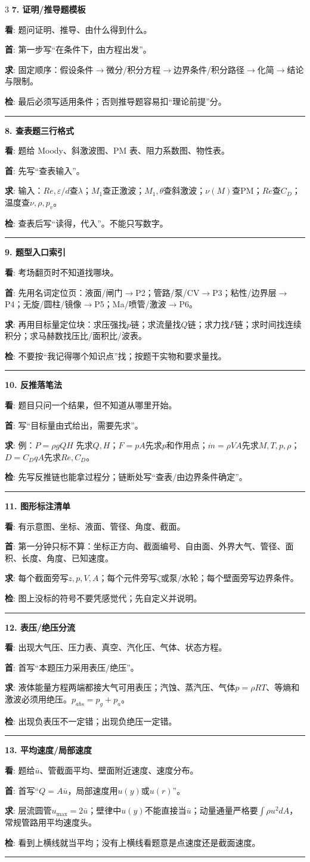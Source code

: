 \documentclass[UTF8,a4paper]{ctexart}
\newcommand{\lab}[1]{\textbf{\textcolor{B}{#1}}}
\newcommand{\blk}[5]{\textbf{\textcolor{B}{#1}}\par
\lab{看}: #2\par
\lab{首}: #3\par
\lab{求}: #4\par
\lab{检}: #5\par\vspace{1pt}\hrule\vspace{1.2pt}}
\begin{document}
\begin{multicols}{3}
\blk{7. 证明/推导题模板}
{题问证明、推导、由什么得到什么。}
{第一步写“在\underline{\hspace{0.45cm}}条件下，由\underline{\hspace{0.6cm}}方程出发”。}
{固定顺序：假设条件$\to$微分/积分方程$\to$边界条件/积分路径$\to$化简$\to$结论与限制。}
{最后必须写适用条件；否则推导题容易扣“理论前提”分。}

\blk{8. 查表题三行格式}
{题给 Moody、斜激波图、PM 表、阻力系数图、物性表。}
{先写“查表输入”。}
{输入：$Re,\varepsilon/d$查$\lambda$；$M_1$查正激波；$M_1,\theta$查斜激波；$\nu(M)$查PM；$Re$查$C_D$；温度查$\nu,\rho,p_v$。}
{查表后写“读得\underline{\hspace{0.5cm}}，代入\underline{\hspace{0.5cm}}”。不能只写数字。}

\blk{9. 题型入口索引}
{考场翻页时不知道找哪块。}
{先用名词定位页：液面/闸门$\to$P2；管路/泵/CV$\to$P3；粘性/边界层$\to$P4；无旋/圆柱/镜像$\to$P5；Ma/喷管/激波$\to$P6。}
{再用目标量定位块：求压强找$p$链；求流量找$Q$链；求力找$F$链；求时间找连续积分；求马赫数找压比/面积比/波表。}
{不要按“我记得哪个知识点”找；按题干实物和要求量找。}

\blk{10. 反推落笔法}
{题目只问一个结果，但不知道从哪里开始。}
{写“目标量由\underline{\hspace{0.5cm}}式给出，需要先求\underline{\hspace{0.5cm}}”。}
{例：$P=\rho gQH$ 先求$Q,H$；$F=pA$先求$p$和作用点；$\dot m=\rho VA$先求$M,T,p,\rho$；$D=C_DqA$先求$Re,C_D$。}
{先写反推链也能拿过程分；链断处写“查表/由边界条件确定”。}

\blk{11. 图形标注清单}
{有示意图、坐标、液面、管径、角度、截面。}
{第一分钟只标不算：坐标正方向、截面编号、自由面、外界大气、管径、面积、长度、角度、已知速度。}
{每个截面旁写$z,p,V,A$；每个元件旁写$\zeta$或泵/水轮；每个壁面旁写边界条件。}
{图上没标的符号不要凭感觉代；先自定义并说明。}

\blk{12. 表压/绝压分流}
{出现大气压、压力表、真空、汽化压、气体、状态方程。}
{首写“本题压力采用表压/绝压”。}
{液体能量方程两端都接大气可用表压；汽蚀、蒸汽压、气体$p=\rho RT$、等熵和激波必须用绝压。$p_{abs}=p_g+p_a$。}
{出现负表压不一定错；出现负绝压一定错。}

\blk{13. 平均速度/局部速度}
{题给$\bar u$、管截面平均、壁面附近速度、速度分布。}
{首写“$Q=A\bar u$，局部速度用$u(y)$或$u(r)$”。}
{层流圆管$u_{\max}=2\bar u$；壁律中$u(y)$不能直接当$\bar u$；动量通量严格要$\int \rho u^2dA$，常规管路用平均速度头。}
{看到上横线就当平均；没有上横线看题意是点速度还是截面速度。}


\end{multicols}
\end{document}
